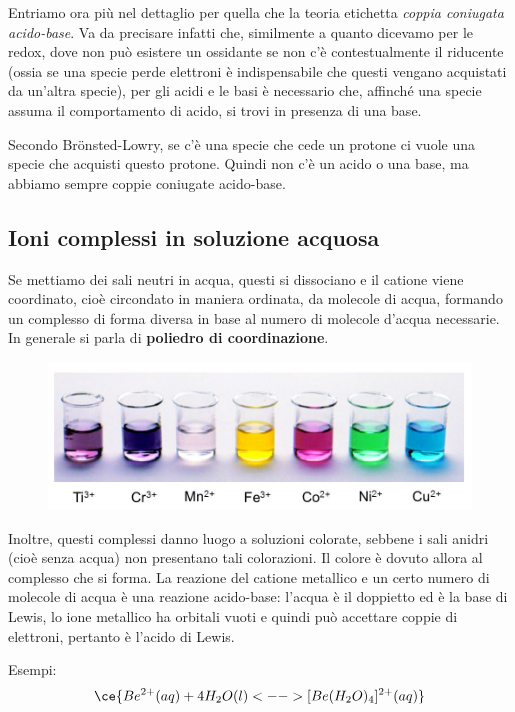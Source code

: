 Entriamo ora più nel dettaglio per quella che la teoria etichetta \textit{coppia coniugata acido-base}. Va da precisare infatti che, similmente a quanto dicevamo per le redox, dove non può esistere un ossidante se non c'è contestualmente il riducente (ossia se una specie perde elettroni è indispensabile che questi vengano acquistati da un'altra specie), per gli acidi e le basi è necessario che, affinché una specie assuma il comportamento di acido, si trovi in presenza di una base.

Secondo Br\"{o}nsted-Lowry, se c'è una specie che cede un protone ci vuole una specie che acquisti questo protone. Quindi non c'è un acido o una base, ma abbiamo sempre coppie coniugate acido-base.

\subsection{Ioni complessi in soluzione acquosa}
Se mettiamo dei sali neutri in acqua, questi si dissociano e il catione viene coordinato, cioè circondato in maniera ordinata, da molecole di acqua, formando un complesso di forma diversa in base al numero di molecole d'acqua necessarie. In generale si parla di \textbf{poliedro di coordinazione}.

\begin{figure}[htp]
    \centering
    \includegraphics[width=12cm]{immagini/ioni_complessi.png}
\end{figure}

Inoltre, questi complessi danno luogo a soluzioni colorate, sebbene i sali anidri (cioè senza acqua) non presentano tali colorazioni. Il colore è dovuto allora al complesso che si forma. La reazione del catione metallico e un certo numero di molecole di acqua è una reazione acido-base: l'acqua è il doppietto ed è la base di Lewis, lo ione metallico ha orbitali vuoti e quindi può accettare coppie di elettroni, pertanto è l'acido di Lewis.

\vspace{0.2cm}Esempi:
$$\ce{Be^{2+}(aq) + 4H_2O(l) <--> [Be(H_2O)_4]^{2+}(aq)}$$

